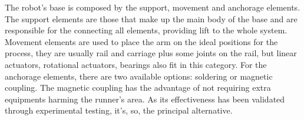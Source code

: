 The robot's base is composed by the support, movement and anchorage elements.
The support elements are those that make up the main body of the base and are
responsible for the connecting all elements, providing lift to the whole system.
Movement elements are used to place the arm on the ideal positions for the
process, they  are usually rail and carriage plus some joints on the rail, but
linear actuators, rotational actuators, bearings also fit in this category. For
the anchorage elements, there are two available options: soldering or magnetic
coupling. The magnetic coupling has the advantage of not requiring extra
equipments harming the runner's area. As its effectiveness has been
validated through experimental testing, it's, so, the principal alternative.







